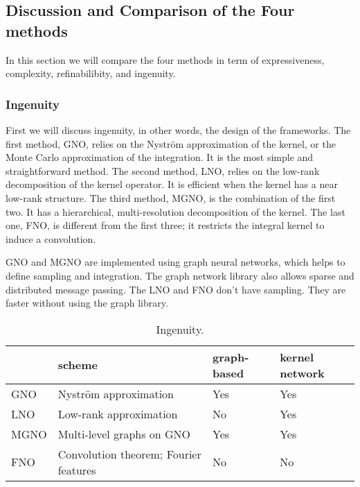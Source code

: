
\subsection{Discussion and Comparison of the Four methods}
\label{ssec:comparsion}

In this section we will compare the four methods in term of expressiveness, complexity, refinabilibity, and ingenuity.

\subsubsection{Ingenuity}
First we will discuss ingenuity, in other words, the design of the frameworks. The first method, GNO, relies on the Nystr\"om approximation of the kernel, or the Monte Carlo approximation of the integration. It is the most simple and straightforward method. The second method, LNO, relies on the low-rank decomposition of the kernel operator. It is efficient when the kernel has a near low-rank structure.  The third method, MGNO, is the combination of the first two. It has a hierarchical, multi-resolution decomposition of the kernel. The last one, FNO, is different from the first three;
it restricts the integral kernel to induce a convolution.

GNO and MGNO are implemented using graph neural networks, which helps to define sampling and integration. The graph network library also allows sparse and distributed message passing. The LNO and FNO don't have sampling. They are faster without using the graph library.


\begin{table}[h]

\begin{center}
\begin{tabular}{l|lll}
& scheme
& graph-based
& kernel network \\  
\hline 
GNO        &  Nystr\"om  approximation & Yes   & Yes  \\
LNO       &  Low-rank approximation & No  & Yes \\
MGNO       &  Multi-level graphs on GNO & Yes   & Yes \\
FNO       & Convolution theorem; Fourier features  & No  & No \\
\hline
\end{tabular}
\end{center}
\caption{Ingenuity.}
\label{table:ingenuity}
\end{table}

